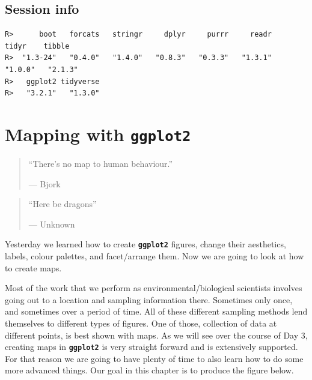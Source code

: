 \documentclass[
]{book}
\newenvironment{Shaded}{\begin{snugshade}}{\end{snugshade}}
\newcommand{\KeywordTok}[1]{\textcolor[rgb]{0.13,0.29,0.53}{\textbf{#1}}}
\newcommand{\NormalTok}[1]{#1}
\newcommand{\OperatorTok}[1]{\textcolor[rgb]{0.81,0.36,0.00}{\textbf{#1}}}
\newcommand{\StringTok}[1]{\textcolor[rgb]{0.31,0.60,0.02}{#1}}
\begin{document}
\hypertarget{session-info-5}{%
\section{Session info}\label{session-info-5}}

\begin{Shaded}
\end{Shaded}

\begin{verbatim}
R>      boot   forcats   stringr     dplyr     purrr     readr     tidyr    tibble 
R>  "1.3-24"   "0.4.0"   "1.4.0"   "0.8.3"   "0.3.3"   "1.3.1"   "1.0.0"   "2.1.3" 
R>   ggplot2 tidyverse 
R>   "3.2.1"   "1.3.0"
\end{verbatim}

\hypertarget{mapping}{%
\chapter{\texorpdfstring{Mapping with \textbf{\texttt{ggplot2}}}{Mapping with ggplot2}}\label{mapping}}

\begin{quote}
``There's no map to human behaviour.''

--- Bjork
\end{quote}

\begin{quote}
``Here be dragons''

--- Unknown
\end{quote}

Yesterday we learned how to create \textbf{\texttt{ggplot2}} figures, change their aesthetics, labels, colour palettes, and facet/arrange them. Now we are going to look at how to create maps.

Most of the work that we perform as environmental/biological scientists involves going out to a location and sampling information there. Sometimes only once, and sometimes over a period of time. All of these different sampling methods lend themselves to different types of figures. One of those, collection of data at different points, is best shown with maps. As we will see over the course of Day 3, creating maps in \textbf{\texttt{ggplot2}} is very straight forward and is extensively supported. For that reason we are going to have plenty of time to also learn how to do some more advanced things. Our goal in this chapter is to produce the figure below.
\end{document}

